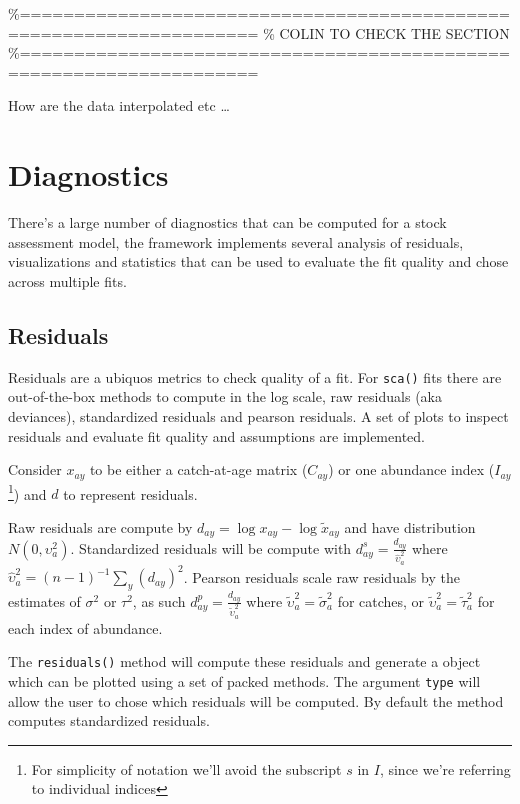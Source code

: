\documentclass[
]{book}
\begin{document}
\%====================================================================
\% COLIN TO CHECK THE SECTION
\%====================================================================

How are the data interpolated etc \ldots{}

\hypertarget{diagnostics}{%
\chapter{\texorpdfstring{Diagnostics \label{sec:diagn}}{Diagnostics }}\label{diagnostics}}

There's a large number of diagnostics that can be computed for a stock assessment model, the \aFa framework implements several analysis of residuals, visualizations and statistics that can be used to evaluate the fit quality and chose across multiple fits.

\hypertarget{residuals}{%
\section{Residuals}\label{residuals}}

Residuals are a ubiquos metrics to check quality of a fit. For \texttt{sca()} fits there are out-of-the-box methods to compute in the log scale, raw residuals (aka deviances), standardized residuals and pearson residuals. A set of plots to inspect residuals and evaluate fit quality and assumptions are implemented.

Consider \(x_{ay}\) to be either a catch-at-age matrix (\(C_{ay}\)) or one abundance index (\(I_{ay}\)\footnote{For simplicity of notation we'll avoid the subscript $s$ in $I$, since we're referring to individual indices}) and \(d\) to represent residuals.

Raw residuals are compute by \(d_{ay} = \log{x_{ay}} - \log{\tilde{x}_{ay}}\) and have distribution \(N(0,\upsilon^2_{a})\). Standardized residuals will be compute with \(d^s_{ay} = \frac{d_{ay}}{\hat{\upsilon}^2_{a}}\) where \(\hat{\upsilon}^2_{a} = (n-1)^{-1} \sum_y(d_{ay})^2\). Pearson residuals scale raw residuals by the estimates of \(\sigma^2\) or \(\tau^2\), as such \(d^p_{ay} = \frac{d_{ay}}{\tilde{\upsilon}^2_{a}}\) where \(\tilde{\upsilon}^2_{a} = \tilde{\sigma}^2_{a}\) for catches, or \(\tilde{\upsilon}^2_{a} = \tilde{\tau}^2_{a}\) for each index of abundance.

The \texttt{residuals()} method will compute these residuals and generate a object which can be plotted using a set of packed methods. The argument \texttt{type} will allow the user to chose which residuals will be computed. By default the method computes standardized residuals.
\end{document}
